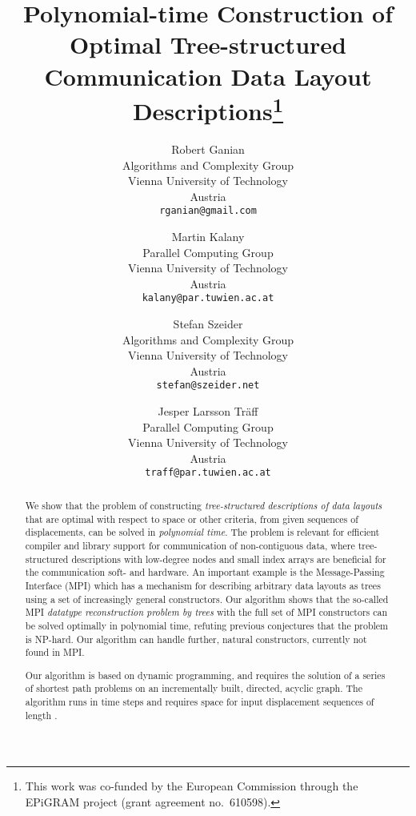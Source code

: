 \documentclass[a4paper,11pt]{article}
\title{Polynomial-time Construction of Optimal Tree-structured
  Communication Data Layout Descriptions\thanks{This work was
    co-funded by the European Commission through the EPiGRAM project
    (grant agreement no.\ 610598).}}
\author{Robert Ganian\\
       Algorithms and Complexity Group\\
       Vienna University of Technology\\
       Austria\\
       \texttt{rganian@gmail.com}
\and Martin Kalany\\
       Parallel Computing Group\\
       Vienna University of Technology\\
       Austria\\
       \texttt{kalany@par.tuwien.ac.at}
\and Stefan Szeider\\
       Algorithms and Complexity Group\\
       Vienna University of Technology\\
       Austria\\
       \texttt{stefan@szeider.net}
\and Jesper Larsson Tr\"aff\\
       Parallel Computing Group\\
       Vienna University of Technology\\
       Austria\\
       \texttt{traff@par.tuwien.ac.at}
}
\begin{document}
\maketitle

\begin{abstract}
We show that the problem of constructing \emph{tree-structured
  descriptions of data layouts} that are optimal with respect to space
or other criteria, from given sequences of displacements, can be
solved in \emph{polynomial time}. The problem is relevant for
efficient compiler and library support for communication of
non-con\-ti\-gu\-ous data, where tree-structured descriptions with
low-degree nodes and small index arrays are beneficial for the
communication soft- and hardware. An important example is the
Message-Passing Interface (MPI) which has a mechanism for describing
arbitrary data layouts as trees using a set of increasingly general
constructors. Our algorithm shows that the so-called MPI
\emph{datatype reconstruction problem by trees} with the full set of
MPI constructors can be solved optimally in polynomial time, refuting
previous conjectures that the problem is NP-hard. Our algorithm can
handle further, natural constructors, currently not found in MPI.

Our algorithm is based on dynamic programming, and requires the
solution of a series of shortest path problems on an incrementally
built, directed, acyclic graph. The algorithm runs in  time
steps and requires  space for input displacement sequences of
length .
\end{abstract}
\end{document}
